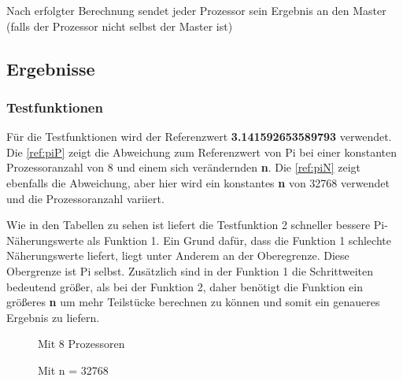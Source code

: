 Nach erfolgter Berechnung sendet jeder Prozessor sein Ergebnis an den Master (falls der Prozessor nicht selbst der Master ist)

\subsection{Ergebnisse}
\label{ref:ergebnisse}

\subsubsection{Testfunktionen}

Für die Testfunktionen wird der Referenzwert \textbf{3.141592653589793} verwendet.
Die \autoref{ref:piP} zeigt die Abweichung zum Referenzwert von Pi bei einer konstanten Prozessoranzahl von 8 und einem sich verändernden \textbf{n}.
Die \autoref{ref:piN} zeigt ebenfalls die Abweichung, aber hier wird ein konstantes \textbf{n} von 32768 verwendet und die Prozessoranzahl variiert.

Wie in den Tabellen zu sehen ist liefert die Testfunktion 2 schneller bessere Pi-Näherungswerte als Funktion 1.
Ein Grund dafür, dass die Funktion 1 schlechte Näherungswerte liefert, liegt unter Anderem an der Oberegrenze.
Diese Obergrenze ist Pi selbst.
Zusätzlich sind in der Funktion 1 die Schrittweiten bedeutend größer, als bei der Funktion 2, daher benötigt die Funktion ein größeres \textbf{n} um mehr Teilstücke berechnen zu können und somit ein genaueres Ergebnis zu liefern.

\begin{center}
\begin{figure}[h]
\begin{minipage}{0.45\textwidth}
	\caption{Mit 8 Prozessoren}
	\label{ref:piP}
\end{minipage}
\hfill
\begin{minipage}{0.45\textwidth}
	\caption{Mit n = 32768}
	\label{ref:piN}
\end{minipage}
\end{figure}
\end{center}



